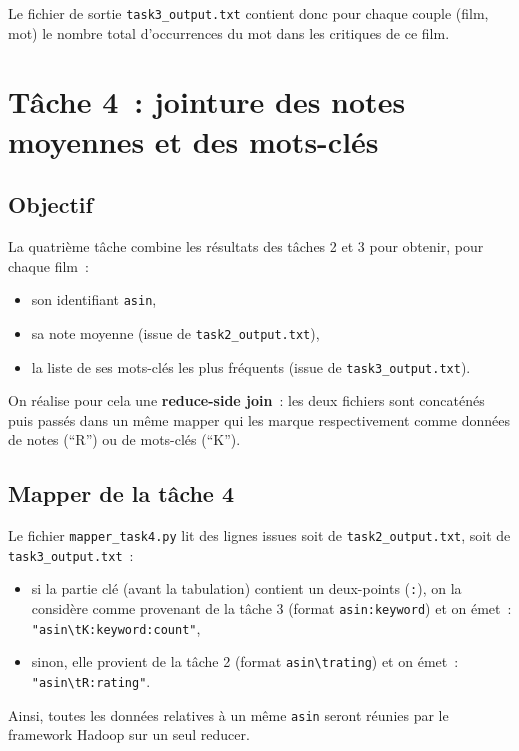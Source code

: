 \documentclass[a4paper,11pt]{article}
\begin{document}
Le fichier de sortie \texttt{task3\_output.txt} contient donc
pour chaque couple (film, mot) le nombre total d'occurrences du mot
dans les critiques de ce film.

\section{Tâche 4~: jointure des notes moyennes et des mots-clés}

\subsection{Objectif}

La quatrième tâche combine les résultats des tâches 2 et 3 pour
obtenir, pour chaque film~:
\begin{itemize}
  \item son identifiant \texttt{asin},\
  \item sa note moyenne (issue de \texttt{task2\_output.txt}),\
  \item la liste de ses mots-clés les plus fréquents (issue de
        \texttt{task3\_output.txt}).
\end{itemize}

On réalise pour cela une \textbf{reduce-side join}~: les deux fichiers
sont concaténés puis passés dans un même mapper qui les marque
respectivement comme données de notes (``R'') ou de mots-clés (``K'').

\subsection{Mapper de la tâche 4}

Le fichier \texttt{mapper\_task4.py} lit des lignes issues soit de
\texttt{task2\_output.txt}, soit de \texttt{task3\_output.txt}~:
\begin{itemize}
  \item si la partie clé (avant la tabulation) contient un deux-points
        (\texttt{:}), on la considère comme provenant de la tâche 3
        (format \texttt{asin:keyword}) et on émet~:\\
        \texttt{"asin\textbackslash tK:keyword:count"},\
  \item sinon, elle provient de la tâche 2 (format \texttt{asin\textbackslash trating})
        et on émet~:\\
        \texttt{"asin\textbackslash tR:rating"}.
\end{itemize}

Ainsi, toutes les données relatives à un même \texttt{asin} seront
réunies par le framework Hadoop sur un seul reducer.
\end{document}
